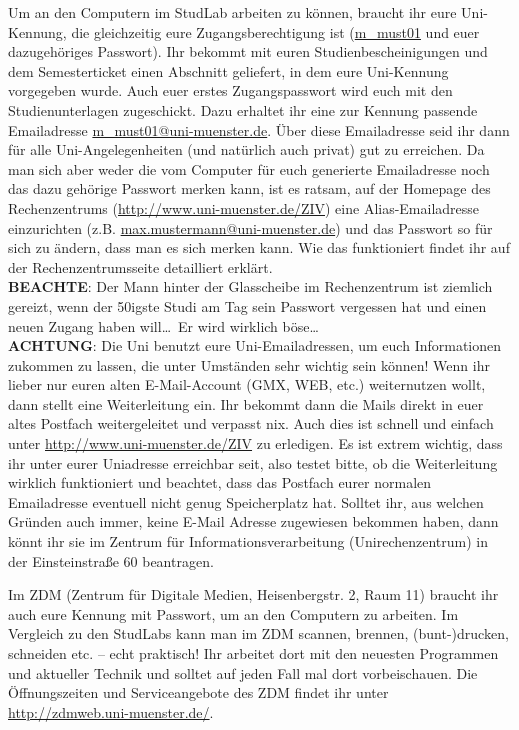 Um an den Computern im StudLab arbeiten zu können, braucht ihr eure Uni-Kennung, die gleichzeitig eure Zugangsberechtigung ist (\url{m_must01} und euer dazugehöriges Passwort). Ihr bekommt mit euren Studienbescheinigungen und dem Semesterticket einen Abschnitt geliefert, in dem eure Uni-Kennung vorgegeben wurde. Auch euer erstes Zugangspasswort wird euch mit den Studienunterlagen zugeschickt. Dazu erhaltet ihr eine zur Kennung passende Emailadresse \url{m_must01@uni-muenster.de}. Über diese Emailadresse seid ihr dann für alle Uni-Angelegenheiten (und natürlich auch privat) gut zu erreichen. Da man sich aber weder die vom Computer für euch generierte Emailadresse noch das dazu gehörige Passwort merken kann, ist es ratsam, auf der Homepage des Rechenzentrums (\url{http://www.uni-muenster.de/ZIV}) eine Alias-Emailadresse einzurichten (z.B. \url{max.mustermann@uni-muenster.de}) und das Passwort so für sich zu ändern, dass man es sich merken kann. Wie das funktioniert ﬁndet ihr auf der Rechenzentrumsseite detailliert erklärt.\\ \textbf{BEACHTE}: Der Mann hinter der Glasscheibe im Rechenzentrum ist ziemlich gereizt, wenn der 50igste Studi am Tag sein Passwort vergessen hat und einen neuen Zugang haben will\dots \mbox{ }Er wird wirklich böse\dots \\
\textbf{ACHTUNG}: Die Uni benutzt eure Uni-Emailadressen, um euch Informationen zukommen zu lassen, die unter Umständen sehr wichtig sein können! Wenn ihr lieber nur euren alten E-Mail-Account (GMX, WEB, etc.) weiternutzen wollt, dann stellt eine Weiterleitung ein. Ihr bekommt dann die Mails direkt in euer altes Postfach weitergeleitet und verpasst nix. Auch dies ist schnell und einfach unter \url{http://www.uni-muenster.de/ZIV} zu erledigen. Es ist extrem wichtig, dass ihr unter eurer Uniadresse erreichbar seit, also testet bitte, ob die Weiterleitung wirklich funktioniert und beachtet, dass das Postfach eurer normalen Emailadresse eventuell nicht genug Speicherplatz hat. Solltet ihr, aus welchen Gründen auch immer, keine E-Mail Adresse zugewiesen bekommen haben, dann könnt ihr sie im Zentrum für Informationsverarbeitung (Unirechenzentrum) in der Einsteinstraße 60 beantragen.

Im ZDM (Zentrum für Digitale Medien, Heisenbergstr. 2, Raum 11) braucht ihr auch eure Kennung mit Passwort, um an den Computern zu arbeiten. Im Vergleich zu den StudLabs kann man im ZDM scannen, brennen, (bunt-)drucken, schneiden etc. – echt praktisch! Ihr arbeitet dort mit den neuesten Programmen und aktueller Technik und solltet auf jeden Fall mal dort vorbeischauen. Die Öffnungszeiten und Serviceangebote des ZDM findet ihr unter \url{http://zdmweb.uni-muenster.de/}.
